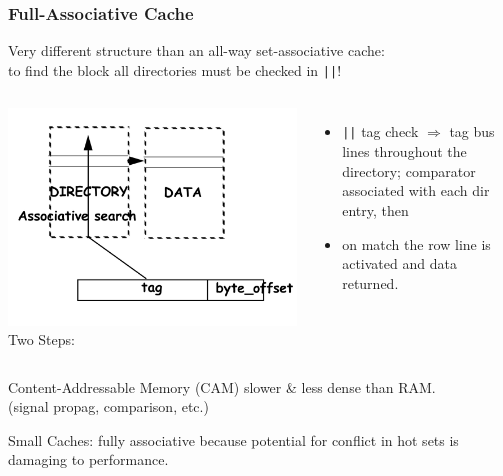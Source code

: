 \documentclass{beamer}
\renewcommand{\emph}[1]{\textcolor{structure}{#1}}
\newcommand{\emp}[1]{\textcolor{DikuRed}{ #1}}
\begin{document}
\begin{frame}[fragile,t]
\frametitle{Full-Associative Cache}
 
Very different structure than an all-way set-associative cache:\\
to find the block all directories must be checked in {\tt ||}!

\begin{columns}
\includegraphics[width=33ex]{FigsMemH/FullAssoc}\pause
{}
Two Steps:
\begin{itemize}
    \item \emp{{\tt||} tag check} $\Rightarrow$ tag bus lines throughout the directory; 
            comparator associated with each dir entry, then
    \item  \emph{on match} the row line is activated and data returned.
\end  {itemize} 
\end{columns}

Content-Addressable Memory (CAM) \emp{slower \& less dense} than RAM.\\
(signal propag, comparison, etc.)\bigskip

Small Caches: fully associative because potential for conflict in hot sets
    is damaging to performance. 

\end{frame}
\end{document}
